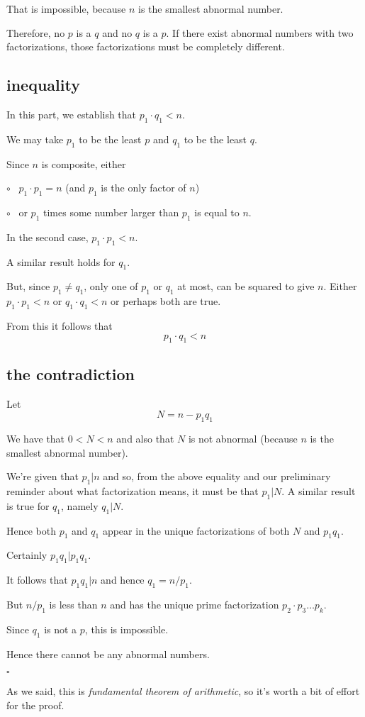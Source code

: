\documentclass[11pt, oneside]{article}
\begin{document}
That is impossible, because $n$ is the smallest abnormal number.

Therefore, no $p$ is a $q$ and no $q$ is a $p$.  If there exist abnormal numbers with two factorizations, those factorizations must be completely different.

\subsection*{inequality}

In this part, we establish that $p_1 \cdot q_1 < n$.

We may take $p_1$ to be the least $p$ and $q_1$ to be the least $q$.  

Since $n$ is composite, either 

$\circ$ \ $p_1 \cdot p_1 = n$ (and $p_1$ is the only factor of $n$)

$\circ$ \ or $p_1$ times some number larger than $p_1$ is equal to $n$.

In the second case, $p_1 \cdot p_1 < n$.

A similar result holds for $q_1$.

But, since $p_1 \ne q_1$, only one of $p_1$ or $q_1$ at most, can be squared to give $n$.  Either $p_1 \cdot p_1 < n$ or $q_1 \cdot q_1 < n$ or perhaps both are true.

From this it follows that 
\[ p_1 \cdot q_1 < n \] 

\subsection*{the contradiction} 

Let 
\[ N = n - p_1 q_1 \]

We have that $0 < N < n$ and also that $N$ is not abnormal (because $n$ is the smallest abnormal number).

We're given that $p_1 | n$ and so, from the above equality and our preliminary reminder about what factorization means, it must be that $p_1 | N$.  A similar result is true for $q_1$, namely $q_1 | N$.  

Hence both $p_1$ and $q_1$ appear in the unique factorizations of both $N$ and $p_1 q_1$.

Certainly $p_1 q_1 | p_1 q_1$.  

It follows that $p_1 q_1 | n$ and hence $q_1 = n/p_1$.  

But $n/p_1$ is less than $n$ and has the unique prime factorization $p_2 \cdot p_3 \dots p_k$.

Since $q_1$ is not a $p$, this is impossible.  

Hence there cannot be any abnormal numbers.

$\square$

As we said, this is \emph{fundamental theorem of arithmetic}, so it's worth a bit of effort for the proof.
\end{document}
